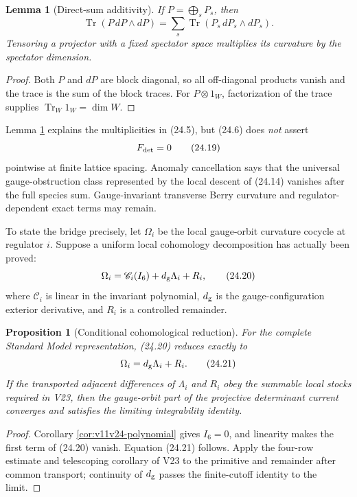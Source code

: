 \documentclass[11pt]{article}
\newtheorem{lemma}[theorem]{Lemma}
\newtheorem{proposition}[theorem]{Proposition}
\newcommand{\Tr}{\operatorname{Tr}}
\begin{document}
\begin{lemma}[Direct-sum additivity]
\label{lem:v11v24-additivity}
If \(P=\bigoplus_sP_s\), then
\[
 \Tr(P\,dP\wedge dP)
 =
 \sum_s\Tr(P_s\,dP_s\wedge dP_s).
 \tag{24.18}
\]
Tensoring a projector with a fixed spectator space multiplies its
curvature by the spectator dimension.
\end{lemma}

\begin{proof}
Both \(P\) and \(dP\) are block diagonal, so all off-diagonal products
vanish and the trace is the sum of the block traces.  For
\(P\otimes1_W\), factorization of the trace supplies
\(\Tr_W1_W=\dim W\).
\end{proof}

Lemma \ref{lem:v11v24-additivity} explains the multiplicities in
(24.5), but (24.6) does \emph{not} assert
\[
 F_{\rm det}=0
 \tag{24.19}
\]
pointwise at finite lattice spacing.  Anomaly cancellation says that the
universal gauge-obstruction class represented by the local descent of
(24.14) vanishes after the full species sum.  Gauge-invariant transverse
Berry curvature and regulator-dependent exact terms may remain.

To state the bridge precisely, let \(\Omega_i\) be the local
gauge-orbit curvature cocycle at regulator \(i\).  Suppose a uniform
local cohomology decomposition has actually been proved:
\[
 \Omega_i
 =
 \mathscr C_i(I_6)+d_{\rm g}\Lambda_i+R_i,
 \tag{24.20}
\]
where \(\mathscr C_i\) is linear in the invariant polynomial,
\(d_{\rm g}\) is the gauge-configuration exterior derivative, and
\(R_i\) is a controlled remainder.

\begin{proposition}[Conditional cohomological reduction]
\label{prop:v11v24-cohomological-reduction}
For the complete Standard Model representation, (24.20) reduces exactly
to
\[
 \Omega_i=d_{\rm g}\Lambda_i+R_i.
 \tag{24.21}
\]
If the transported adjacent differences of \(\Lambda_i\) and \(R_i\)
obey the summable local stocks required in V23, then the gauge-orbit
part of the projective determinant current converges and satisfies the
limiting integrability identity.
\end{proposition}

\begin{proof}
Corollary \ref{cor:v11v24-polynomial} gives \(I_6=0\), and linearity makes
the first term of (24.20) vanish.  Equation (24.21) follows.  Apply the
four-row estimate and telescoping corollary of V23 to the primitive and
remainder after common transport; continuity of \(d_{\rm g}\) passes the
finite-cutoff identity to the limit.
\end{proof}
\end{document}
